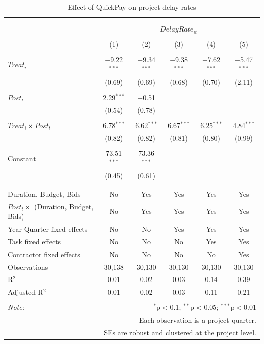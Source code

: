 \documentclass[
]{article}
\begin{document}
\begin{table}[H] \centering 
  \caption{Effect of QuickPay on project delay rates} 
  \label{} 
\small 
\begin{tabular}{@{\extracolsep{-2pt}}lccccc} 
\\[-1.8ex]\hline 
\hline \\[-1.8ex] 
\\[-1.8ex] & \multicolumn{5}{c}{$DelayRate_{it}$} \\ 
\\[-1.8ex] & (1) & (2) & (3) & (4) & (5)\\ 
\hline \\[-1.8ex] 
 $Treat_i$ & $-$9.22$^{***}$ & $-$9.34$^{***}$ & $-$9.38$^{***}$ & $-$7.62$^{***}$ & $-$5.47$^{***}$ \\ 
  & (0.69) & (0.69) & (0.68) & (0.70) & (2.11) \\ 
  & & & & & \\ 
 $Post_t$ & 2.29$^{***}$ & $-$0.51 &  &  &  \\ 
  & (0.54) & (0.78) &  &  &  \\ 
  & & & & & \\ 
 $Treat_i \times Post_t$ & 6.78$^{***}$ & 6.62$^{***}$ & 6.67$^{***}$ & 6.25$^{***}$ & 4.84$^{***}$ \\ 
  & (0.82) & (0.82) & (0.81) & (0.80) & (0.99) \\ 
  & & & & & \\ 
 Constant & 73.51$^{***}$ & 73.36$^{***}$ &  &  &  \\ 
  & (0.45) & (0.61) &  &  &  \\ 
  & & & & & \\ 
\hline \\[-1.8ex] 
Duration, Budget, Bids & No & Yes & Yes & Yes & Yes \\ 
$Post_t \times$  (Duration, Budget, Bids) & No & Yes & Yes & Yes & Yes \\ 
Year-Quarter fixed effects & No & No & Yes & Yes & Yes \\ 
Task fixed effects & No & No & No & Yes & Yes \\ 
Contractor fixed effects & No & No & No & No & Yes \\ 
Observations & 30,138 & 30,130 & 30,130 & 30,130 & 30,130 \\ 
R$^{2}$ & 0.01 & 0.02 & 0.03 & 0.14 & 0.39 \\ 
Adjusted R$^{2}$ & 0.01 & 0.02 & 0.03 & 0.11 & 0.21 \\ 
\hline 
\hline \\[-1.8ex] 
\textit{Note:}  & \multicolumn{5}{r}{$^{*}$p$<$0.1; $^{**}$p$<$0.05; $^{***}$p$<$0.01} \\ 
 & \multicolumn{5}{r}{Each observation is a project-quarter.} \\ 
 & \multicolumn{5}{r}{SEs are robust and clustered at the project level.} \\ 
\end{tabular} 
\end{table}
\end{document}
